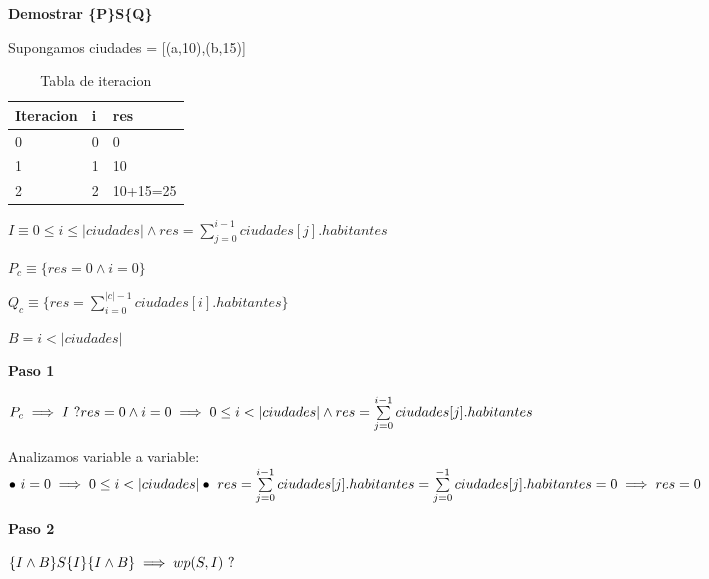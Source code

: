 \documentclass[10pt,a4paper]{article}
\begin{document}
\vspace{0.3cm}

\textbf{Demostrar \{P\}S\{Q\}}

\vspace{0.1cm}

\noindent Supongamos ciudades = [(a,10),(b,15)]

\begin{table}[h!]
	\begin{tabular}{| l | l | l |} 
		\hline
		Iteracion & i & res  \\ [0.5ex] 
		\hline
		0 & 0 & 0 \\ 
		1 & 1 & 10 \\
		2 & 2 & 10+15=25 \\
		\hline
	\end{tabular}
	\captionsetup{singlelinecheck=off}
	\caption{Tabla de iteracion}
	\label{tab:iteracion}
\end{table}

$ I \equiv 0 \leq i \leq |ciudades| \wedge res = \sum\limits_{j=0}^{i-1} ciudades[j].habitantes$

$ P_c \equiv \{res = 0 \wedge i = 0\}$

$ Q_c \equiv \{res = \sum\limits_{i=0}^{|c|-1} ciudades[i].habitantes\}$

$ B = i < |ciudades|$

\vspace{0.3cm}

\textbf{Paso 1}

\vspace{0.1cm}

\noindent$P_c \implies I \ ? \\ res = 0 \wedge i = 0 \implies 0 \leq i < |ciudades| \wedge res = \sum\limits_{j=0}^{i-1} ciudades[j].habitantes$

Analizamos variable a variable: \\ $\bullet \ i = 0 \implies 0 \leq i < |ciudades| \\ \bullet \ res = \sum\limits_{j=0}^{i-1} ciudades[j].habitantes = \sum\limits_{j=0}^{-1} ciudades[j].habitantes = 0 \implies res = 0 $

\vspace{0.3cm}

\textbf{Paso 2}

\vspace{0.1cm}

\noindent$\{I \wedge B\} S \{I\} \\ \{I \wedge B\} \implies wp(S,I) \ ?$
\end{document}
